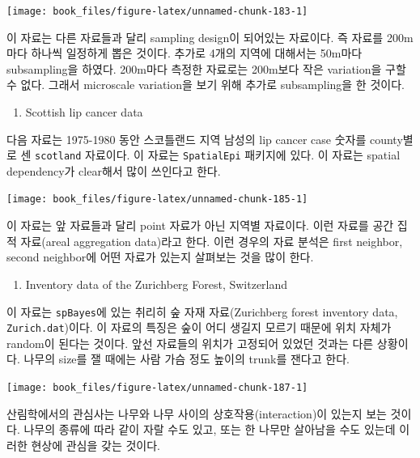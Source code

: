 \documentclass[b5paper,]{scrbook}
\providecommand{\tightlist}{%
  \setlength{\itemsep}{0pt}\setlength{\parskip}{0pt}}
\theoremstyle{plain}
\theoremstyle{definition}
\numberwithin{equation}{section}
\begin{document}
\begin{center}\texttt{[image: book\_files/figure-latex/unnamed-chunk-183-1]} \end{center}

이 자료는 다른 자료들과 달리 sampling design이 되어있는 자료이다. 즉
자료를 200m마다 하나씩 일정하게 뽑은 것이다. 추가로 4개의 지역에
대해서는 50m마다 subsampling을 하였다. 200m마다 측정한 자료로는 200m보다
작은 variation을 구할 수 없다. 그래서 microscale variation을 보기 위해
추가로 subsampling을 한 것이다.

\begin{enumerate}
\def\labelenumi{\arabic{enumi}.}
\setcounter{enumi}{2}
\tightlist
\item
  Scottish lip cancer data
\end{enumerate}

다음 자료는 1975-1980 동안 스코틀랜드 지역 남성의 lip cancer case 숫자를
county별로 센 \texttt{scotland} 자료이다. 이 자료는 \texttt{SpatialEpi}
패키지에 있다. 이 자료는 spatial dependency가 clear해서 많이 쓰인다고
한다.

\begin{center}\texttt{[image: book\_files/figure-latex/unnamed-chunk-185-1]} \end{center}

이 자료는 앞 자료들과 달리 point 자료가 아닌 지역별 자료이다. 이런
자료를 공간 집적 자료(areal aggregation data)라고 한다. 이런 경우의 자료
분석은 first neighbor, second neighbor에 어떤 자료가 있는지 살펴보는
것을 많이 한다.

\begin{enumerate}
\def\labelenumi{\arabic{enumi}.}
\setcounter{enumi}{3}
\tightlist
\item
  Inventory data of the Zurichberg Forest, Switzerland
\end{enumerate}

이 자료는 \texttt{spBayes}에 있는 취리히 숲 자재 자료(Zurichberg forest
inventory data, \texttt{Zurich.dat})이다. 이 자료의 특징은 숲이 어디
생길지 모르기 때문에 위치 자체가 random이 된다는 것이다. 앞선 자료들의
위치가 고정되어 있었던 것과는 다른 상황이다. 나무의 size를 잴 때에는
사람 가슴 정도 높이의 trunk를 잰다고 한다.

\begin{center}\texttt{[image: book\_files/figure-latex/unnamed-chunk-187-1]} \end{center}

산림학에서의 관심사는 나무와 나무 사이의 상호작용(interaction)이 있는지
보는 것이다. 나무의 종류에 따라 같이 자랄 수도 있고, 또는 한 나무만
살아남을 수도 있는데 이러한 현상에 관심을 갖는 것이다.
\end{document}
